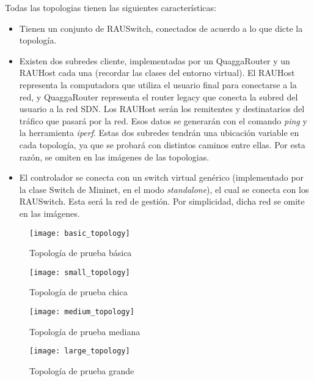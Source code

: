 Todas las topologias tienen las siguientes características:
\begin{itemize}
	\item Tienen un conjunto de RAUSwitch, conectados de acuerdo a lo que dicte la topología.
	\item Existen dos subredes cliente, implementadas por un QuaggaRouter y un RAUHost cada una (recordar las clases del entorno virtual). El RAUHost representa la computadora que utiliza el usuario final para conectarse a la red, y QuaggaRouter representa el router legacy que conecta la subred del usuario a la red SDN. Los RAUHost serán los remitentes y destinatarios del tráfico que pasará por la red. Esos datos se generarán con el comando \textit{ping} y la herramienta \textit{iperf}. Estas dos subredes tendrán una ubicación variable en cada topología, ya que se probará con distintos caminos entre ellas. Por esta razón, se omiten en las imágenes de las topologias.
	\item El controlador se conecta con un switch virtual genérico (implementado por la clase Switch de Mininet, en el modo \textit{standalone}), el cual se conecta con los RAUSwitch. Esta será la red de gestión. Por simplicidad, dicha red se omite en las imágenes.
\end{itemize}

\begin{figure}[H]
	\caption{Topología de prueba básica}
	\texttt{[image: basic\_topology]}
	\centering
	\label{fig:basic_topology}
\end{figure}

\begin{figure}[H]
	\caption{Topología de prueba chica}
	\texttt{[image: small\_topology]}
	\centering
	\label{fig:small_topology}
\end{figure}

\begin{figure}[H]
	\caption{Topología de prueba mediana}
	\texttt{[image: medium\_topology]}
	\centering
	\label{fig:medium_topology}
\end{figure}

\begin{figure}[H]
	\caption{Topología de prueba grande}
	\texttt{[image: large\_topology]}
	\centering
	\label{fig:large_topology}
\end{figure}

